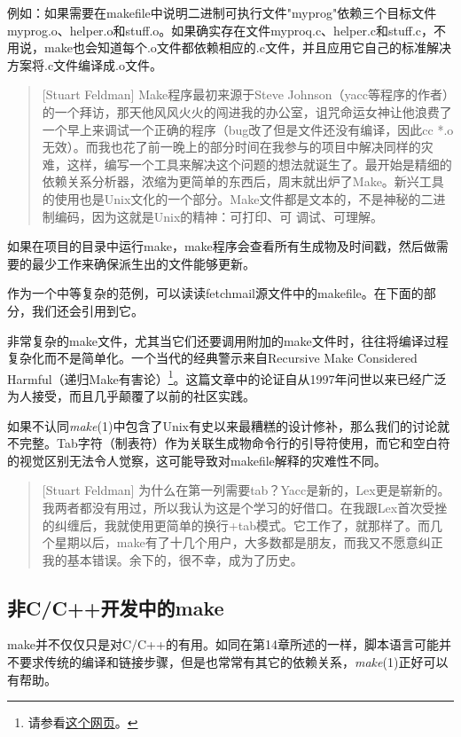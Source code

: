 \documentclass[12pt,oneside]{ctexbook}
\begin{document}
\begin{common-format}
例如：如果需要在makefile中说明二进制可执行文件"myprog"依赖三个目标文件myprog.o、helper.o和stuff.o。如果确实存在文件myproq.c\linebreak 、helper.c和stuff.c，不用说，make也会知道每个.o文件都依赖相应的.c文件，并且应用它自己的标准解决方案将.c文件编译成.o文件。

\begin{quote}[Stuart Feldman]
Make程序最初来源于Steve Johnson（yacc等程序的作者）的一个拜访，那天他风风火火的闯进我的办公室，诅咒命运女神让他浪费了一个早上来调试一个正确的程序（bug改了但是文件还没有编译，因此cc *.o无效）。而我也花了前一晚上的部分时间在我参与的项目中解决同样的灾难，这样，编写一个工具来解决这个问题的想法就诞生了。最开始是精细的依赖关系分析器，浓缩为更简单的东西后，周末就出炉了Make。新兴工具的使用也是Unix文化的一个部分。Make文件都是文本的，不是神秘的二进制编码，因为这就是Unix的精神：可打印、可
调试、可理解。
\end{quote}

如果在项目的目录中运行make，make程序会查看所有生成物及时间戳，然后做需要的最少工作来确保派生出的文件能够更新。

作为一个中等复杂的范例，可以读读fetchmail源文件中的makefile。在下面的部分，我们还会引用到它。

非常复杂的make文件，尤其当它们还要调用附加的make文件时，往往将编译过程复杂化而不是简单化。一个当代的经典警示来自Recursive Make Considered Harmful（递归Make有害论）\footnote{请参看\href{http://www.tip.net.au/~millerp/rmch/recu-make-cons-harm.html}{这个网页}。}。这篇文章中的论证自从1997年问世以来已经广泛为人接受，而且几乎颠覆了以前的社区实践。

如果不认同\textit{make}(1)中包含了Unix有史以来最糟糕的设计修补，那么我们的讨论就不完整。Tab字符（制表符）作为关联生成物命令行的引导符使用，而它和空白符的视觉区别无法令人觉察，这可能导致对makefile解释的灾难性不同。

\begin{quote}[Stuart Feldman]
为什么在第一列需要tab？Yacc是新的，Lex更是崭新的。我两者都没有用过，所以我认为这是个学习的好借口。在我跟Lex首次受挫的纠缠后，我就使用更简单的换行+tab模式。它工作了，就那样了。而几个星期以后，make有了十几个用户，大多数都是朋友，而我又不愿意纠正我的基本错误。余下的，很不幸，成为了历史。
\end{quote}


\subsection{非C/C++开发中的make}
make并不仅仅只是对C/C++的有用。如同在第14章所述的一样，脚本语言可能并不要求传统的编译和链接步骤，但是也常常有其它的依赖关系，\textit{make}(1)正好可以有帮助。


\end{common-format}
\end{document}
